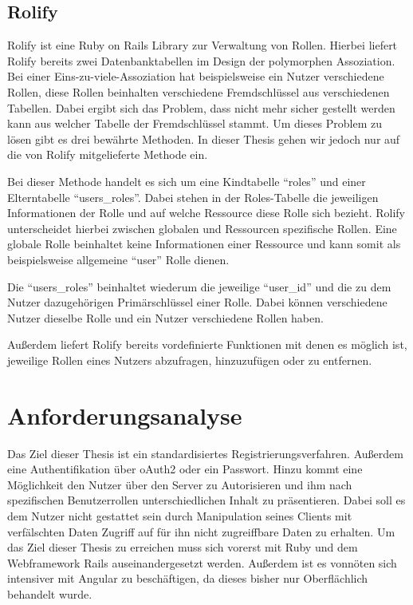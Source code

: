 \documentclass[11pt]{article}
\begin{document}
	\subsection{Rolify}
	\label{sec: rolify}
	Rolify ist eine Ruby on Rails Library zur Verwaltung von Rollen. Hierbei liefert Rolify bereits zwei Datenbanktabellen im Design der polymorphen Assoziation. Bei einer Eins-zu-viele-Assoziation hat beispielsweise ein Nutzer verschiedene Rollen, diese Rollen beinhalten verschiedene Fremdschlüssel aus verschiedenen Tabellen. Dabei ergibt sich das Problem, dass nicht mehr sicher gestellt werden kann aus welcher Tabelle der Fremdschlüssel stammt. Um dieses Problem zu lösen gibt es drei bewährte Methoden. In dieser Thesis gehen wir jedoch nur auf die von Rolify mitgelieferte Methode ein.
	
	Bei dieser Methode handelt es sich um eine Kindtabelle \enquote{roles} und einer Elterntabelle \enquote{users\_roles}. Dabei stehen in der Roles-Tabelle die jeweiligen Informationen der Rolle und auf welche Ressource diese Rolle sich bezieht. Rolify unterscheidet hierbei zwischen globalen und Ressourcen spezifische Rollen. Eine globale Rolle beinhaltet keine Informationen einer Ressource und kann somit als beispielsweise allgemeine \enquote{user} Rolle dienen.
	
	Die \enquote{users\_roles} beinhaltet wiederum die jeweilige \enquote{user\_id} und die zu dem Nutzer dazugehörigen Primärschlüssel einer Rolle. Dabei können verschiedene Nutzer dieselbe Rolle und ein Nutzer verschiedene Rollen haben.
	
	Außerdem liefert Rolify bereits vordefinierte Funktionen mit denen es möglich ist, jeweilige Rollen eines Nutzers abzufragen, hinzuzufügen oder zu entfernen.
	
	\section{Anforderungsanalyse}
	\label{sec: analyze}
	Das Ziel dieser Thesis ist ein standardisiertes Registrierungsverfahren. Außerdem eine Authentifikation über \gls{oAuth2} oder ein Passwort. Hinzu kommt eine Möglichkeit den Nutzer über den Server zu Autorisieren und ihm nach spezifischen Benutzerrollen unterschiedlichen Inhalt zu präsentieren. Dabei soll es dem Nutzer nicht gestattet sein durch Manipulation seines Clients mit verfälschten Daten Zugriff auf für ihn nicht zugreiffbare Daten zu erhalten. Um das Ziel dieser Thesis zu erreichen muss sich vorerst mit Ruby und dem Webframework Rails auseinandergesetzt werden. Außerdem ist es vonnöten sich intensiver mit Angular zu beschäftigen, da dieses bisher nur Oberflächlich behandelt wurde. 
	
\end{document}
